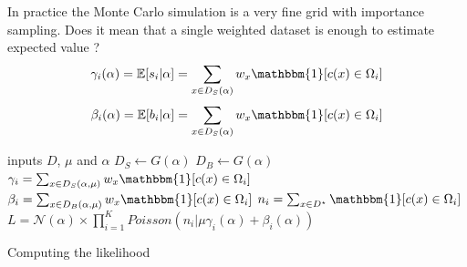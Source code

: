 In practice the Monte Carlo simulation is a very fine grid with importance sampling.
Does it mean that a single weighted dataset is enough to estimate expected value ?
\begin{equation}
  \gamma_i(\alpha) = \EE[s_i | \alpha] = \sum_{x \in D_S(\alpha)} w_x \mathbbm{1} [c(x)\in \Omega_i]
\end{equation}
\begin{equation}
  \beta_i(\alpha) = \EE[b_i | \alpha] = \sum_{x \in D_S(\alpha)} w_x \mathbbm{1} [c(x)\in \Omega_i]
\end{equation}


\begin{algorithm}[H]
 inputs $D$, $\mu$ and $\alpha$ \;
 $D_S \gets G(\alpha)$ \;
 $D_B \gets G(\alpha)$ \;
 $\gamma_i =  \sum_{x \in D_S(\alpha, \mu)} w_x \mathbbm{1} [c(x)\in \Omega_i] $ \;
 $\beta_i =  \sum_{x \in D_B(\alpha, \mu)} w_x \mathbbm{1} [c(x)\in \Omega_i] $ \;
 $n_i = \sum_{x \in D^\star} \mathbbm{1} [c(x)\in \Omega_i]$ \;
 $L = \mathcal N (\alpha) \times \prod_{i=1}^K Poisson(n_i | \mu \gamma_i(\alpha) + \beta_i(\alpha) )$ \;
\caption{Computing the likelihood}
\end{algorithm}



